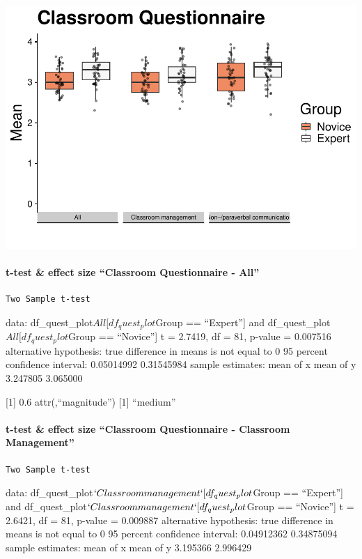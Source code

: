 \documentclass[
]{article}
\begin{document}
\includegraphics{expertise_2024_09_26_no_outlierdetection_MK_files/figure-latex/classroom questionnaire-1.pdf}

\paragraph{t-test \& effect size ``Classroom Questionnaire -
All''}\label{t-test-effect-size-classroom-questionnaire---all}

\begin{verbatim}
Two Sample t-test
\end{verbatim}

data: df\_quest\_plot\(All[df_quest_plot\)Group == ``Expert''{]} and
df\_quest\_plot\(All[df_quest_plot\)Group == ``Novice''{]} t = 2.7419,
df = 81, p-value = 0.007516 alternative hypothesis: true difference in
means is not equal to 0 95 percent confidence interval: 0.05014992
0.31545984 sample estimates: mean of x mean of y 3.247805 3.065000

{[}1{]} 0.6 attr(,``magnitude'') {[}1{]} ``medium''

\paragraph{t-test \& effect size ``Classroom Questionnaire - Classroom
Management''}\label{t-test-effect-size-classroom-questionnaire---classroom-management}

\begin{verbatim}
Two Sample t-test
\end{verbatim}

data: df\_quest\_plot\(`Classroom management`[df_quest_plot\)Group ==
``Expert''{]} and
df\_quest\_plot\(`Classroom management`[df_quest_plot\)Group ==
``Novice''{]} t = 2.6421, df = 81, p-value = 0.009887 alternative
hypothesis: true difference in means is not equal to 0 95 percent
confidence interval: 0.04912362 0.34875094 sample estimates: mean of x
mean of y 3.195366 2.996429
\end{document}
